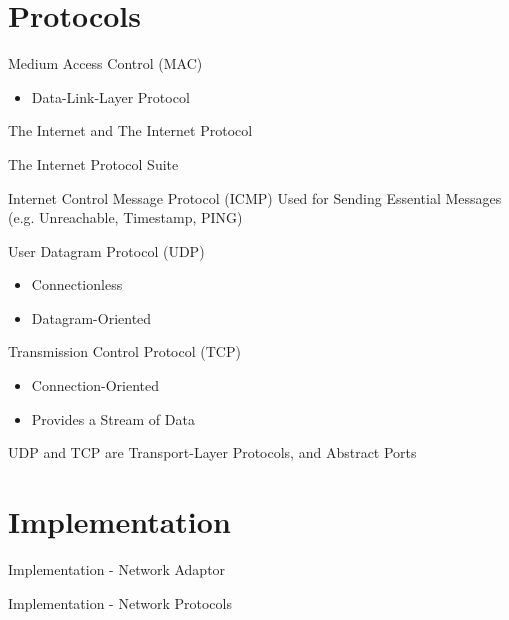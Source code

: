 \documentclass{beamer}
\begin{document}
\section{Protocols}

    \begin{frame}{Medium Access Control (MAC)}
        \begin{itemize}
            \item Data-Link-Layer Protocol
        \end{itemize}
    \end{frame}

    \begin{frame}{The Internet and The Internet Protocol}

    \end{frame}

    \begin{frame}{The Internet Protocol Suite}
        \begin{block}{Internet Control Message Protocol (ICMP)}
            Used for Sending Essential Messages (e.g. Unreachable, Timestamp, PING)
        \end{block}

        \begin{block}{User Datagram Protocol (UDP)}
            \begin{itemize}
                \item Connectionless
                \item Datagram-Oriented
            \end{itemize}
        \end{block}

        \begin{block}{Transmission Control Protocol (TCP)}
            \begin{itemize}
                \item Connection-Oriented
                \item Provides a Stream of Data
            \end{itemize}
        \end{block}

        UDP and TCP are Transport-Layer Protocols, and Abstract Ports
    \end{frame}

\section{Implementation}

    \begin{frame}{Implementation - Network Adaptor}

    \end{frame}

    \begin{frame}{Implementation - Network Protocols}

    \end{frame}
\end{document}
